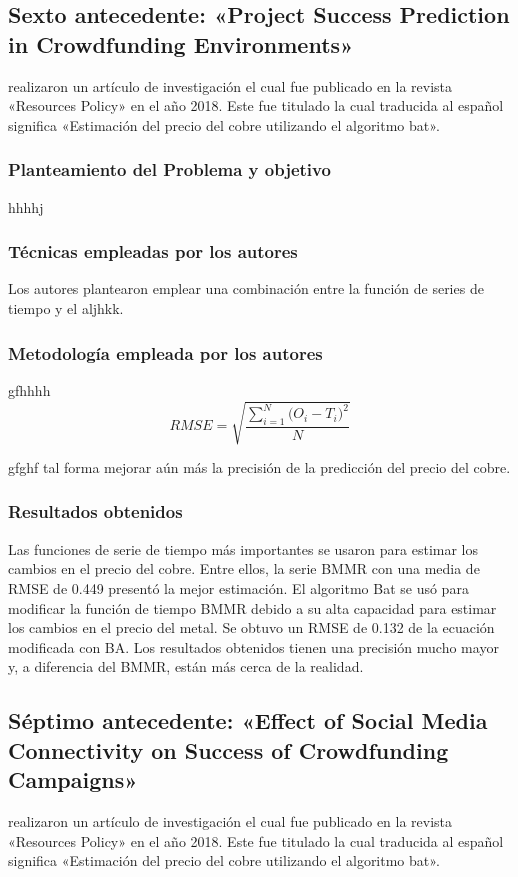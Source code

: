 \subsection{Sexto antecedente: «Project Success Prediction in Crowdfunding Environments» \citep*{pr_li2016predcrowd}}
\citeauthor{pr_li2016predcrowd} realizaron un artículo de investigación el cual fue publicado en la revista «Resources Policy» en el año 2018. Este fue titulado  la cual traducida al español significa «Estimación del precio del cobre utilizando el algoritmo bat».

\subsubsection{Planteamiento del Problema y objetivo }
hhhhj

\subsubsection{Técnicas empleadas por los autores}
Los autores plantearon emplear una combinación entre la función de series de tiempo y el aljhkk. 

\subsubsection{Metodología empleada por los autores}
gfhhhh
\begin{equation}  
\label{eq:RMSE}
RMSE = \sqrt{\frac{\sum_{i=1}^{N}{\Big(O_i -T_i\Big)^2}}{N}}
\end{equation}

gfghf tal forma mejorar aún más la precisión de la predicción del precio del cobre.

\subsubsection{Resultados obtenidos}
Las funciones de serie de tiempo más importantes se usaron para estimar los cambios en el precio del cobre. Entre ellos, la serie BMMR con una media de RMSE de 0.449 presentó la mejor estimación. El algoritmo Bat  se usó para modificar la función de tiempo BMMR debido a su alta capacidad para estimar los cambios en el precio del metal. Se obtuvo un RMSE de 0.132 de la ecuación modificada con BA. Los resultados obtenidos tienen una precisión mucho mayor y, a diferencia del BMMR, están más cerca de la realidad.


\subsection{Séptimo antecedente: «Effect of Social Media Connectivity on Success of Crowdfunding Campaigns» \citep*{pr_kaur2017socmedcrowd}}
\citeauthor{pr_kaur2017socmedcrowd} realizaron un artículo de investigación el cual fue publicado en la revista «Resources Policy» en el año 2018. Este fue titulado  la cual traducida al español significa «Estimación del precio del cobre utilizando el algoritmo bat».

